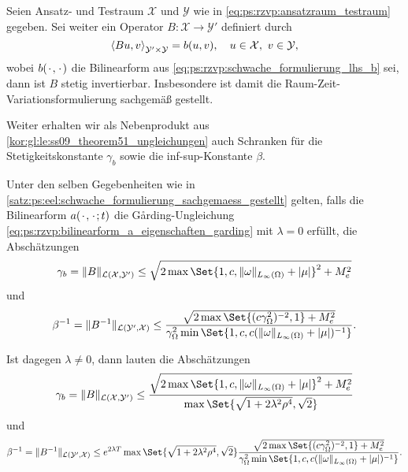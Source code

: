 \begin{Korollar}
\label{satz:ps:eel:schwache_formulierung_sachgemaess_gestellt}
    Seien Ansatz- und Testraum $\mathcal X$ und $\mathcal Y$ wie in \cref{eq:ps:rzvp:ansatzraum_testraum} gegeben.
    Sei weiter ein Operator $B \colon \mathcal X \to \mathcal Y'$ definiert durch
    \begin{equation}
        \left\langle Bu,v\right\rangle_{\mathcal Y' \times \mathcal Y}  = b(u, v), \quad u \in \mathcal X,~ v \in \mathcal Y,
    \end{equation}
    wobei $b({\mkern2mu\cdot\mkern2mu}, {\mkern2mu\cdot\mkern2mu})$ die Bilinearform aus \cref{eq:ps:rzvp:schwache_formulierung_lhs_b} sei,
    dann ist $B$ stetig invertierbar.
    Insbesondere ist damit die Raum-Zeit-Variationsformulierung sachgemäß gestellt.
\end{Korollar}

Weiter erhalten wir als Nebenprodukt aus \cref{kor:gl:le:ss09_theorem51_ungleichungen} auch Schranken für die Stetigkeitskonstante $\gamma_{b}$ sowie die inf-sup-Konstante $\beta$.

\begin{Korollar}
\label{kor:ps:eel:schwache_formulierung_operator_schranken}
    Unter den selben Gegebenheiten wie in \cref{satz:ps:eel:schwache_formulierung_sachgemaess_gestellt} gelten, falls die Bilinearform $a({\mkern2mu\cdot\mkern2mu}, {\mkern2mu\cdot\mkern2mu};t)$ die G\aa{}rding-Ungleichung \cref{eq:ps:rzvp:bilinearform_a_eigenschaften_garding} mit $\lambda = 0$ erfüllt, die Abschätzungen
    \begin{equation}
        \gamma_{b} = \norm{B}_{\mathcal L(\mathcal X, \mathcal Y')} \leq \sqrt{2 \max\Set{1, c, \norm{\omega}_{L_{\infty}(\Omega)} + \abs{\mu}}^{2} + M_{e}^{2}}
    \end{equation}
    und
    \begin{equation}
        \beta^{-1} = \norm{B^{-1}}_{\mathcal L(\mathcal Y', \mathcal X)} \leq \frac{\sqrt{2 \max \Set{(c \gamma_{\Omega}^{2})^{-2}, 1} + M_{e}^{2}}}{\gamma_{\Omega}^{2} \min\Set{1, c , c  (\norm{\omega}_{L_{\infty}(\Omega)} + \abs{\mu})^{-1}}}.
    \end{equation}

    Ist dagegen $\lambda \neq 0$, dann lauten die Abschätzungen
    \begin{equation}
        \gamma_{b} = \norm{B}_{\mathcal L(\mathcal X, \mathcal Y')} \leq \frac{\sqrt{2 \max\Set{1, c, \norm{\omega}_{L_{\infty}(\Omega)} + \abs{\mu}}^{2} + M_{e}^{2}}}{\max\Set{\sqrt{1 + 2 \lambda^{2} \rho^{4}}, \sqrt{2}}}
    \end{equation}
    und
    \begin{equation}
        \beta^{-1} = \norm{B^{-1}}_{\mathcal L(\mathcal Y', \mathcal X)} \leq e^{2 \lambda T} \max\Set{\sqrt{1 + 2 \lambda^{2} \rho^{4}}, \sqrt{2}} \frac{\sqrt{2 \max \Set{(c \gamma_{\Omega}^{2})^{-2}, 1} + M_{e}^{2}}}{\gamma_{\Omega}^{2} \min\Set{1, c , c  (\norm{\omega}_{L_{\infty}(\Omega)} + \abs{\mu})^{-1}}}.
    \end{equation}
\end{Korollar}

